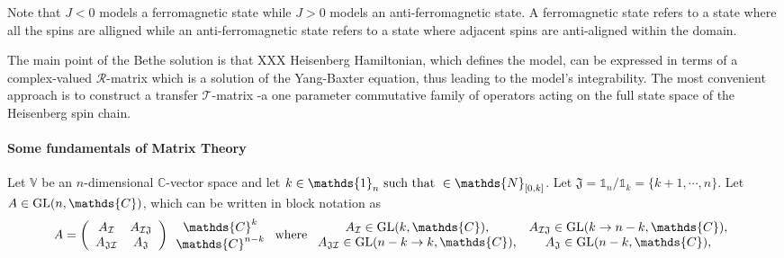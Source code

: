 \documentclass{homework}
\begin{document}
Note that $J < 0$ models a ferromagnetic state while $J > 0$ models an anti-ferromagnetic state. A ferromagnetic state refers to a state where all the spins are alligned while an anti-ferromagnetic state refers to a state where adjacent spins are anti-aligned within the domain. \\

\begin{tcolorbox}[colback = my-blue,title = Physical Context]

The main point of the Bethe solution is that XXX Heisenberg Hamiltonian, which defines the model, can be expressed in terms of a complex-valued $\bm{\mathcal R}$-matrix which is a solution of the Yang-Baxter equation, thus leading to the model's integrability. The most convenient approach is to construct a transfer $\bm{\mathcal{T}}$-matrix -a one parameter commutative family of operators acting on the full state space of the Heisenberg spin chain. \\

\end{tcolorbox}

\paragraph{\textbf{Some fundamentals of Matrix Theory}}

Let $\mathds{V}$ be an $n$-dimensional $\mathds{C}$-vector space and let $k \in \mathds{1}_n \textnormal{ such that } \in \mathds{N}_{[0, k]}$. Let $\mathfrak{J} = \mathds{1}_n / \mathds{1}_k = \{k+1,\cdots, n\}$. Let $A \in \textnormal{GL}(n, \mathds{C})$, which can be written in block notation as 
\begin{equation}
    A = \left(\begin{array}{cc}
        A_{\mathcal{I}} & A_{\mathcal{I} \mathfrak{J}}  \\
        A_{\mathfrak{J} \mathcal{I}} & A_{\mathfrak{J}}
    \end{array}\right) \begin{array}{c}
         \mathds{C}^k  \\
         \mathds{C}^{n-k}
    \end{array} \textnormal{ where } \begin{array}{cc}
        A_{\mathcal{I}} \in \textnormal{GL}(k, \mathds{C}),  &  A_{\mathcal{I} \mathfrak{J}} \in \textnormal{GL}(k \rightarrow n-k, \mathds{C}), \\
        A_{\mathfrak{J} \mathcal{I}} \in  \textnormal{GL}(n-k \rightarrow k, \mathds{C}), & A_{\mathfrak{J}}  \in \textnormal{GL}(n-k, \mathds{C}),
    \end{array} 
\end{equation}
\end{document}
